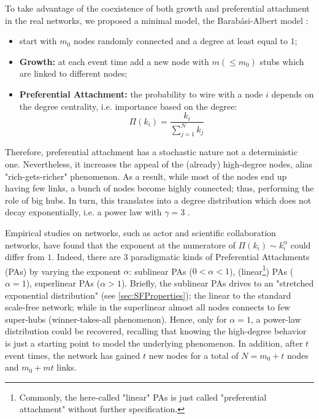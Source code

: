 \documentclass[a4paper,10pt,twoside]{book} %
\theoremstyle{definition}
\begin{document}
\label{sec:BA_model}
To take advantage of the coexistence of both growth and preferential attachment in the real networks, we proposed a minimal model, the Barabási-Albert model \cite{barabasi::2016networkbook}:
\begin{itemize}
	\item start with $m_0$ nodes randomly connected and a degree at least equal to $1$;
	\item \textbf{Growth:} at each event time add a new node with $m(\leq  m_0)$ stubs which are linked to different nodes;
	\item \textbf{Preferential Attachment:} the probability to wire with a node $i$ depends on the degree centrality, i.e. importance based on the degree:
	\begin{equation}
		\Pi(k_i) = \frac{k_i}{\sum_{j = 1}^N k_j}
	\end{equation}
\end{itemize}

Therefore, preferential attachment has a stochastic nature not a deterministic one. Nevertheless, it increases the appeal of the (already) high-degree nodes, alias \label{cit:S.Sagone} "rich-gets-richer" phenomenon. As a result, while most of the nodes end up having few links, a bunch of nodes become highly connected; thus, performing the role of big hubs. In turn, this translates into a degree distribution which does not decay exponentially, i.e. a power law with $\gamma = 3$ \cite{barabasi::2016networkbook}. 

Empirical studies on networks, such as actor and scientific collaboration networks, have found that the exponent at the numeratore of $\Pi(k_i) \sim k_i^\alpha$ could differ from $1$.
Indeed, there are $3$ paradigmatic kinds of Preferential Attachments (PAs) by varying the exponent $\alpha$: sublinear PAs ($0<\alpha<1$), (linear\footnote{Commonly, the here-called "linear" PAs is just called "preferential attachment" without further specification.}) PAs ($\alpha = 1$), superlinear PAs ($\alpha>1$). Briefly, the sublinear PAs drives to an "stretched exponential distribution" (see \autoref{sec:SFProperties}); the linear to the standard scale-free network; while in the superlinear almost all nodes connects to few super-hubs (winner-takes-all phenomenon).
Hence, only for $\alpha = 1$, a power-law distribution could be recovered, recalling that knowing the high-degree behavior is just a starting point to model the underlying phenomenon. 
In addition, after $t$ event times, the network has gained $t$ new nodes for a total of $N = m_0 + t$ nodes and $m_0 + mt$ links.
\end{document}
